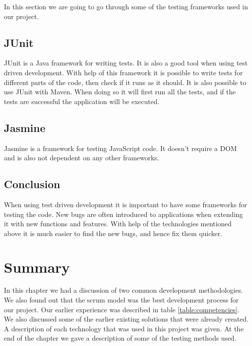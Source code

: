 In this section we are going to go through some of the testing frameworks used in our project.

\subsection{JUnit} \nocite{JUnit}

JUnit is a Java framework for writing tests. It is also a good tool when using test driven development.
With help of this framework it is possible to write tests for different parts of the code, then check if it runs as it should.
It is also possible to use JUnit with Maven.
When doing so it will first run all the tests, and if the tests are successful the application will be executed.

\subsection{Jasmine} \nocite{Jasmine}

Jasmine is a framework for testing JavaScript code.	
It doesn't require a DOM and is also not dependent on any other frameworks.

\subsection{Conclusion}

When using test driven development it is important to have some frameworks for testing the code.
New bugs are often introduced to applications when extending it with new functions and features.
With help of the technologies mentioned above it is much easier to find the new bugs, and hence fix them quicker.


\section{Summary}
\label{section:summary}

In this chapter we had a discussion of two common development methodologies.
We also found out that the scrum model was the best development process for our project.
Our earlier experience was described in table \ref{table:competencies}.
We also discussed some of the earlier existing solutions that were already created.
A description of each technology that was used in this project was given. 
At the end of the chapter we gave a description of some of the testing methods used.